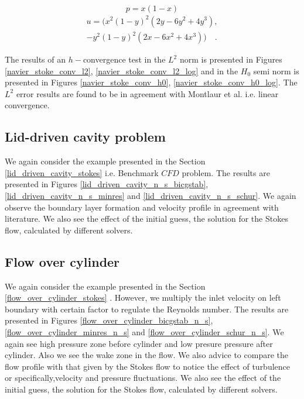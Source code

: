 \documentclass[a4paper,openany]{book}
\begin{document}
\begin{center}
\begin{equation}
p = x(1 - x)
\end{equation}
\begin{equation} 
\begin{split}
u = (x^2(1-y)^2(2y-6y^2+4y^3),\\-y^2(1-y)^2(2x-6x^2+4x^3)) \quad \textrm{.}
\end{split}
\end{equation}
\end{center}

The results of an $h-$convergence test in the $L^2$ norm is presented in Figures \ref{navier_stoke_conv_l2}, \ref{navier_stoke_conv_l2_log} and in the $H_0$ semi norm is presented in Figures \ref{navier_stoke_conv_h0}, \ref{navier_stoke_conv_h0_log}. The $L^2$ error results are found to be in agreement with Montlaur et al. \cite{Montlaur} i.e. linear convergence.\\

\subsection{Lid-driven cavity problem} \label{lid_driven_cavity_navier_stokes}

We again consider the example presented in the Section \ref{lid_driven_cavity_stokes} i.e. Benchmark $CFD$ problem. The results are presented in Figures \ref{lid_driven_cavity_n_s_bicgstab}, \ref{lid_driven_cavity_n_s_minres} and \ref{lid_driven_cavity_n_s_schur}. We again observe the boundary layer formation and velocity profile in agreement with literature. We also see the effect of the initial guess, the solution for the Stokes flow, calculated by different solvers. 

\subsection{Flow over cylinder} \label{flow_over_cylinder_navier_stokes}

We again consider the example presented in the Section \ref{flow_over_cylinder_stokes} . However, we multiply the inlet velocity on left boundary with certain factor to regulate the Reynolds number. The results are presented in Figures \ref{flow_over_cylinder_bicgstab_n_s}, \ref{flow_over_cylinder_minres_n_s} and \ref{flow_over_cylinder_schur_n_s}. We again see high pressure zone before cylinder and low presure pressure after cylinder. Also we see the wake zone in the flow. We also advice to compare the flow profile with that given by the Stokes flow to notice the effect of turbulence or specifically,velocity and pressure fluctuations. We also see the effect of the initial guess, the solution for the Stokes flow, calculated by different solvers. 
\end{document}
